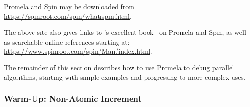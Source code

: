 Promela and Spin may be downloaded from
\url{https://spinroot.com/spin/whatispin.html}.

The above site also gives links to 's excellent
book~\cite{Holzmann03a} on Promela and Spin,
as well as searchable online references starting at:
\url{https://www.spinroot.com/spin/Man/index.html}.

The remainder of this section describes how to use Promela to debug
parallel algorithms, starting with simple examples and progressing to
more complex uses.

\subsubsection{Warm-Up: Non-Atomic Increment}
\label{sec:formal:Warm-Up: Non-Atomic Increment}

